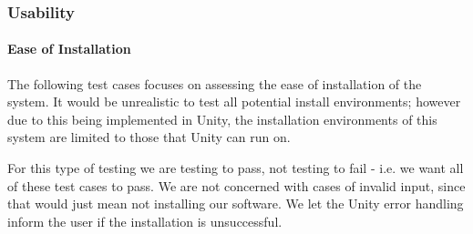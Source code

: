 \documentclass[12pt, titlepage]{article}
\begin{document}
\subsubsection{Usability}
\paragraph{Ease of Installation}
The following test cases focuses on assessing the ease of installation of the 
system. It would be unrealistic to test all potential install environments; 
however due to this being implemented in Unity, the installation environments 
of this system are limited to those that Unity can run on.

For this type of testing we are testing to pass, not testing to fail - i.e. we 
want all of these test cases to pass. We are not concerned with cases of 
invalid input, since that would just mean not installing our software. We let 
the Unity error handling inform the user if the installation is unsuccessful.
\end{document}
